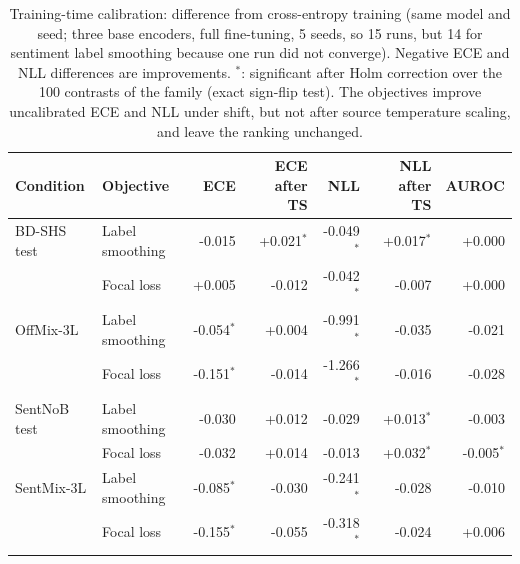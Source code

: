 \begin{table}[t]
\centering
\small
\caption{Training-time calibration: difference from cross-entropy training (same model and seed; three base encoders, full fine-tuning, 5 seeds, so 15 runs, but 14 for sentiment label smoothing because one run did not converge). Negative ECE and NLL differences are improvements. $^{*}$: significant after Holm correction over the 100 contrasts of the family (exact sign-flip test). The objectives improve uncalibrated ECE and NLL under shift, but not after source temperature scaling, and leave the ranking unchanged.}
\label{tab:training-objectives}
\begin{tabular}{llrrrrr}
\toprule
Condition & Objective & ECE & ECE after TS & NLL & NLL after TS & AUROC \\
\midrule
BD-SHS test & Label smoothing & -0.015 & +0.021$^{*}$ & -0.049$^{*}$ & +0.017$^{*}$ & +0.000 \\
 & Focal loss & +0.005 & -0.012 & -0.042$^{*}$ & -0.007 & +0.000 \\
\midrule
OffMix-3L & Label smoothing & -0.054$^{*}$ & +0.004 & -0.991$^{*}$ & -0.035 & -0.021 \\
 & Focal loss & -0.151$^{*}$ & -0.014 & -1.266$^{*}$ & -0.016 & -0.028 \\
\midrule
SentNoB test & Label smoothing & -0.030 & +0.012 & -0.029 & +0.013$^{*}$ & -0.003 \\
 & Focal loss & -0.032 & +0.014 & -0.013 & +0.032$^{*}$ & -0.005$^{*}$ \\
\midrule
SentMix-3L & Label smoothing & -0.085$^{*}$ & -0.030 & -0.241$^{*}$ & -0.028 & -0.010 \\
 & Focal loss & -0.155$^{*}$ & -0.055 & -0.318$^{*}$ & -0.024 & +0.006 \\
\bottomrule
\end{tabular}
\end{table}
